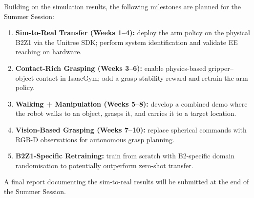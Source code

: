 Building on the simulation results, the following milestones are planned
for the Summer Session:

\begin{enumerate}[nosep]
  \item \textbf{Sim-to-Real Transfer (Weeks 1--4):} deploy the arm
        policy on the physical B2Z1 via the Unitree SDK; perform system
        identification and validate EE reaching on hardware.
  \item \textbf{Contact-Rich Grasping (Weeks 3--6):} enable
        physics-based gripper--object contact in IsaacGym; add a grasp
        stability reward and retrain the arm policy.
  \item \textbf{Walking + Manipulation (Weeks 5--8):} develop a combined
        demo where the robot walks to an object, grasps it, and carries
        it to a target location.
  \item \textbf{Vision-Based Grasping (Weeks 7--10):} replace spherical
        commands with RGB-D observations for autonomous grasp planning.
  \item \textbf{B2Z1-Specific Retraining:} train from scratch with
        B2-specific domain randomisation to potentially outperform
        zero-shot transfer.
\end{enumerate}

\noindent
A final report documenting the sim-to-real results will be submitted at
the end of the Summer Session.

